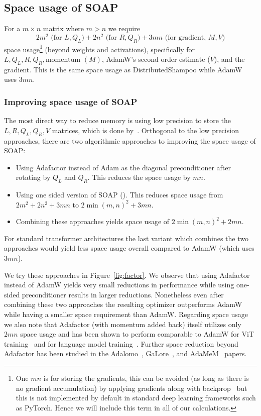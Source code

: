 \documentclass{article}
\begin{document}
\subsection{Space usage of SOAP}
\label{app:adafactor}

For a $m \times n$ matrix where $m > n$ we require $$2m^2\text{ (for $L, Q_L$)}+2n^2\text{ (for $R, Q_R$)}+3mn\text{ (for gradient, $M, V$)}$$ space usage\footnote{One $mn$ is for storing the gradients, this can be avoided (as long as there is no gradient accumulation) by applying gradients along with backprop~\citep{lomo} but this is not implemented by default in standard deep learning frameworks such as PyTorch. Hence we will include this term in all of our calculations.} (beyond weights and activations), specifically for $L, Q_L, R, Q_R, \text{momentum }(M)$, AdamW's second order estimate ($V$), and the gradient. This is the same space usage as DistributedShampoo while AdamW uses $3mn$.

\subsubsection{Improving space usage of SOAP}
\label{app:impr-space}

The most direct way to reduce memory is using low precision to store the $L, R, Q_L, Q_R, V$ matrices, which is done by~\citet{8bitadam,4bitshampoo}. Orthogonal to the low precision approaches, there are two algorithmic approaches to improving the space usage of SOAP: 
\begin{itemize}
    \item Using Adafactor instead of Adam as the diagonal preconditioner after rotating by $Q_L$ and $Q_R$. This reduces the space usage by $mn$.
    \item Using one sided version of SOAP (). This reduces space usage from $2m^2+2n^2+3mn$ to $2 \min(m,n)^2 + 3mn$.
    \item Combining these approaches yields space usage of $2 \min(m,n)^2 + 2mn$.
\end{itemize} 
For standard transformer architectures the last variant which combines the two approaches would yield less space usage overall compared to AdamW (which uses $3mn$).

We try these approaches in Figure~\ref{fig:factor}. We observe that using Adafactor instead of AdamW yields very small reductions in performance while using one-sided preconditioner results in larger reductions. Nonetheless even after combining these two approaches the resulting optimizer outperforms AdamW while having a smaller space requirement than AdamW. Regarding space usage we also note that Adafactor (with momentum added back) itself utilizes only $2mn$ space usage and has been shown to perform comparable to AdamW for ViT training~\citep{zhai} and for language model training~\citep{zhaoscience}. Further space reduction beyond Adafactor has been studied in the Adalomo~\citep{adalomo}, GaLore~\citep{galore}, and AdaMeM~\citep{adamem} papers.
\end{document}
